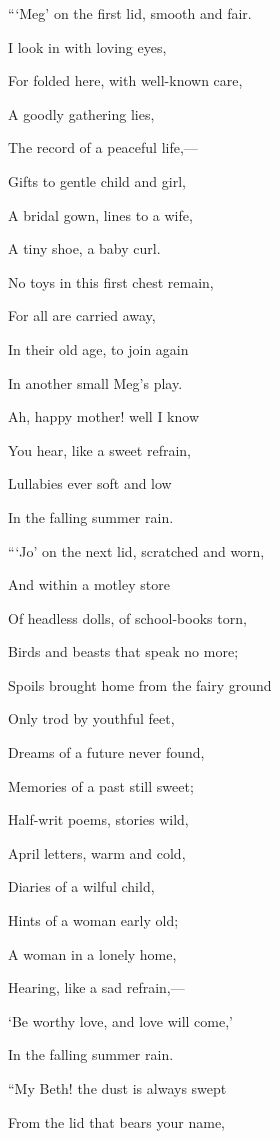 \hfill\break

```Meg' on the first lid, smooth and
fair.

I look in with loving eyes,

For folded here, with well-known care,

A goodly gathering lies,

The record of a peaceful life,---

Gifts to gentle child and girl,

A bridal gown, lines to a wife,

A tiny shoe, a baby curl.

No toys in this first chest remain,

For all are carried away,

In their old age, to join again

In another small Meg's play.

Ah, happy mother! well I know

You hear, like a sweet refrain,

Lullabies ever soft and low

In the falling summer rain.

\hfill\break

```Jo' on the next lid, scratched and
worn,

And within a motley store

Of headless dolls, of school-books torn,

Birds and beasts that speak no more;

Spoils brought home from the fairy ground

Only trod by youthful feet,

Dreams of a future never found,

Memories of a past still sweet;

Half-writ poems, stories wild,

April letters, warm and cold,

Diaries of a wilful child,

Hints of a woman early old;

A woman in a lonely home,

Hearing, like a sad refrain,---

`Be worthy love, and love will come,'

In the falling summer rain.

\hfill\break

``My Beth! the dust is always swept

From the lid that bears your name,


